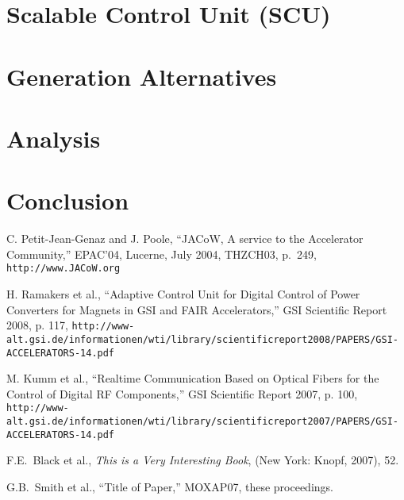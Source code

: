 \documentclass{JAC2003}
\begin{document}
\section{Scalable Control Unit (SCU)}


\section{Generation Alternatives}


\section{Analysis}


\section{Conclusion}




\begin{thebibliography}{9}   %

C. Petit-Jean-Genaz and J. Poole, ``JACoW, A service to the Accelerator Community,''
EPAC'04, Lucerne, July 2004, THZCH03,  p.~249, \texttt{http://www.JACoW.org}

H. Ramakers  et al., ``Adaptive Control Unit for Digital Control of Power Converters for Magnets in GSI and FAIR Accelerators,'' GSI Scientific Report 2008, p. 117,
\texttt{http://www-alt.gsi.de/informationen/wti/library/scientificreport2008/PAPERS/GSI-ACCELERATORS-14.pdf}

M. Kumm  et al., ``Realtime Communication Based on Optical Fibers for the Control of Digital RF Components,'' GSI Scientific Report 2007, p. 100,
\texttt{http://www-alt.gsi.de/informationen/wti/library/scientificreport2007/PAPERS/GSI-ACCELERATORS-14.pdf}



F.E.~Black et al., {\it This is a Very Interesting Book}, (New York: Knopf, 2007), 52.

G.B.~Smith et al., ``Title of Paper,'' MOXAP07, these proceedings.
\end{thebibliography}
\end{document}
